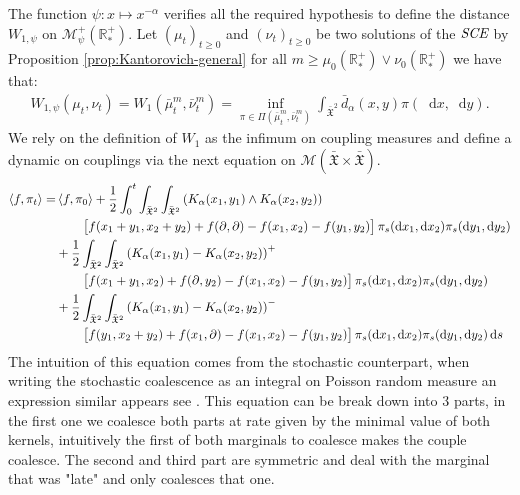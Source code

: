 \documentclass[11pt,a4paper]{article}
\newcommand{\RRP}{\mathbb{R}^+_*}
\newcommand{\MC}{\mathcal{M}}
\newcommand{\XF}{\mathfrak{X}}
\newcommand{\SCE}{\emph{SCE}}
\newcommand{\Proc}[1]{\left(#1\right)_{t\geq 0}}
\newcommand{\brac}[1]{\left\langle#1\right\rangle}
\newcommand{\dd}{\mathop{}\!\mathrm{d}}
\begin{document}
The function $\psi : x \mapsto x^{-\alpha}$ verifies all the required hypothesis to define the distance $W_{1,\psi}$ on $\MC^+_{\psi}(\RRP)$. Let $\Proc{\mu_t}$ and $\Proc{\nu_t}$ be two solutions of the $\SCE$ by Proposition \ref{prop:Kantorovich-general} for all $m \geq \mu_0(\RRP) \vee \nu_0(\RRP)$ we have that:
\begin{align*}
    W_{1,\psi}(\mu_t,\nu_t) = W_1\left(\bar{\mu}^m_t,\bar{\nu}^m_t \right) = \inf_{\pi \in \Pi(\bar{\mu}^m_t,\bar{\nu}^m_t)} \int_{\bar{\XF}^2} \bar{d}_\alpha(x,y) \pi(\dd x, \dd y).
\end{align*}
We rely on the definition of $W_1$ as the infimum on coupling measures and define a dynamic on couplings via the next equation on $\MC(\bar{\XF}\times \bar{\XF})$.
\begin{align*}
\brac{f,\pi_t} =& \brac{f,\pi_0} + \dfrac12\int_0^t \int_{\bar{\XF}^2} \int_{\bar{\XF}^2}\left(K_\alpha(x_1,y_1)\wedge K_\alpha(x_2,y_2) \right) \\
    &\qquad  \left[f(x_1+y_1,x_2+y_2) + f(\partial,\partial)- f(x_1,x_2) -f(y_1,y_2) \vphantom{A^2} \right]\pi_s(\dd x_1,\dd x_2)\pi_s(\dd y_1,\dd y_2)\\
    &+ \dfrac12\int_{\bar{\XF}^2}\int_{\bar{\XF}^2} \left(K_\alpha(x_1,y_1)- K_\alpha(x_2,y_2) \right)^+ \\
    &\qquad\left[f(x_1+y_1,x_2) + f(\partial,y_2)- f(x_1,x_2) -f(y_1,y_2) \vphantom{A^2} \right]\pi_s(\dd x_1,\dd x_2)\pi_s(\dd y_1,\dd y_2)\\
    &+ \dfrac12\int_{\bar{\XF}^2}\int_{\bar{\XF}^2} \left(K_\alpha(x_1,y_1)- K_\alpha(x_2,y_2) \right)^-\\
    &\qquad\left[f(y_1,x_2 + y_2) + f(x_1,\partial)- f(x_1,x_2) -f(y_1,y_2) \vphantom{A^2} \right]\pi_s(\dd x_1,\dd x_2)\pi_s(\dd y_1,\dd y_2) \dd s
\end{align*}
The intuition of this equation comes from the stochastic counterpart, when writing the stochastic coalescence as an  integral on Poisson random measure an expression similar appears see \cite{fournier2004convergence}. This equation can be break down into $3$ parts, in the first one we coalesce both parts at rate given by the minimal value of both kernels, intuitively the first of both marginals to coalesce makes the couple coalesce. The second and third part are symmetric and deal with the marginal that was "late" and only coalesces that one.

\newpage
\end{document}
